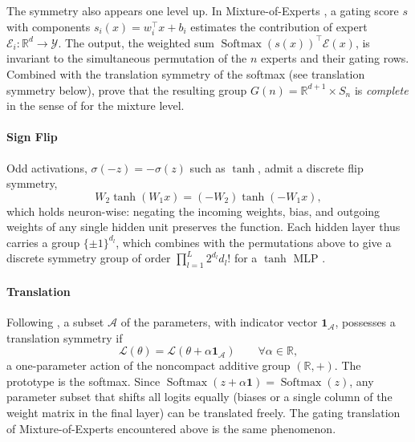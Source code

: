 \documentclass[mathematics,review,submit,moreauthors]{Definitions/mdpi}
\begin{document}
The symmetry also appears one level up.
In Mixture-of-Experts \citep{shazeer2017}, a gating score $s$ with components $s_i(x)=w_i^{\top}x+b_i$ estimates the contribution of expert $\mathcal{E}_i:\mathbb{R}^d\to\mathcal{Y}$.
The output, the weighted sum $\operatorname{Softmax}(s(x))^{\top}\mathcal{E}(x)$, is invariant to the simultaneous permutation of the $n$ experts and their gating rows.
Combined with the translation symmetry of the softmax (see translation symmetry below), \citet{tran2025anips} prove that the resulting group $G(n)=\mathbb{R}^{d+1}\times S_n$ is \emph{complete} in the sense of  for the mixture level.

\paragraph{Sign Flip}
Odd activations, $\sigma(-z)=-\sigma(z)$ such as $\tanh$, admit a discrete flip symmetry,
\begin{equation*}
    W_2\tanh(W_1x)=(-W_2)\tanh(-W_1x),
\end{equation*}
which holds neuron-wise: negating the incoming weights, bias, and outgoing weights of any single hidden unit preserves the function.
Each hidden layer thus carries a group $\{\pm 1\}^{d_l}$, which combines with the permutations above to give a discrete symmetry group of order $\prod_{l=1}^{L}2^{d_l}d_l!$ for a $\tanh$ MLP \citep{hecht-nielsen1990anc}.

\paragraph{Translation}
Following \citet{kunin2020}, a subset $\mathcal{A}$ of the parameters, with indicator vector $\boldsymbol{1}_{\mathcal{A}}$, possesses a translation symmetry if
\begin{equation*}
    \mathcal{L}(\theta)=\mathcal{L}(\theta+\alpha\boldsymbol{1}_{\mathcal{A}}) \qquad \forall\alpha\in\mathbb{R},
\end{equation*}
a one-parameter action of the noncompact additive group $(\mathbb{R},+)$.
The prototype is the softmax.
Since $\operatorname{Softmax}(z+\alpha\boldsymbol{1})=\operatorname{Softmax}(z)$, any parameter subset that shifts all logits equally (biases or a single column of the weight matrix in the final layer) can be translated freely.
The gating translation of Mixture-of-Experts encountered above is the same phenomenon.
\end{document}
